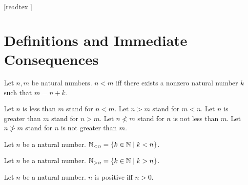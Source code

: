 \documentclass[10pt]{article}
\begin{document}
  \begin{imports}
    \begin{forthel}
      [readtex ]
    \end{forthel}
  \end{imports}


  \section{Definitions and Immediate Consequences}

  \begin{forthel}
    \begin{definition}
      Let $n, m$ be natural numbers.
      $n < m$ iff there exists a nonzero natural number $k$ such that
      $m = n + k$.
    \end{definition}

    Let $n$ is less than $m$ stand for $n < m$.
    Let $n > m$ stand for $m < n$.
    Let $n$ is greater than $m$ stand for $n > m$.
    Let $n \nless m$ stand for $n$ is not less than $m$.
    Let $n \ngtr m$ stand for $n$ is not greater than $m$.
  \end{forthel}

  \begin{forthel}
    \begin{definition}
      Let $n$ be a natural number.
      $\mathbb{N}_{< n} = \{ k \in \mathbb{N} \mid k < n \}$.
    \end{definition}
  \end{forthel}

  \begin{forthel}
    \begin{definition}
      Let $n$ be a natural number.
      $\mathbb{N}_{> n} = \{ k \in \mathbb{N} \mid k > n \}$.
    \end{definition}
  \end{forthel}

  \begin{forthel}
    \begin{definition}
      Let $n$ be a natural number.
      $n$ is positive iff $n > 0$.
    \end{definition}
  \end{forthel}
\end{document}
